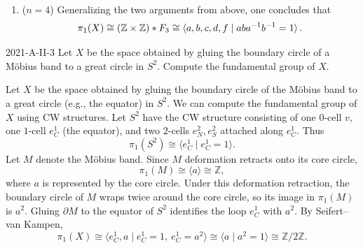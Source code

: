 \documentclass{article}
\begin{document}
\begin{enumerate}[itemsep =-2pt,label = (\arabic{*})]
		\begin{equation*}
			\pi_1(T) \cong (\mathbb{Z} \times \mathbb{Z}) \ast F_2 \cong \braket{a, b, c, d \mid aba^{-1}b^{-1} = 1}. 
		\end{equation*}
		\item ($n = 4$) Generalizing the two arguments from above, one concludes that 
		\begin{equation*}
			\pi_1(X) \cong (\mathbb{Z} \times \mathbb{Z}) \ast F_{3} \cong \braket{a, b, c, d, f \mid aba^{-1}b^{-1} = 1}. 
		\end{equation*}
	\end{enumerate}
	
	\begin{prb}{2021-A-II-3}
		Let $X$ be the space obtained by gluing the boundary circle of a M\"obius band to a great circle in $S^{2}$. Compute the fundamental group of $X$. 
	\end{prb}
	Let $X$ be the space obtained by gluing the boundary circle of the M\"obius band to a great circle (e.g., the equator) in $S^{2}$. We can compute the fundamental group of $X$ using CW structures. Let $S^2$ have the CW structure consisting of one $0$-cell $v$, one $1$-cell $e_C^1$ (the equator), and two $2$-cells $e_N^2,e_S^2$ attached along $e_C^1$. Thus
	\begin{equation*}
		\pi_1(S^2)\cong \langle e_C^1 \mid e_C^1 = 1 \rangle.
	\end{equation*}
	Let $M$ denote the Möbius band. Since $M$ deformation retracts onto its core circle,
	\begin{equation*}
		\pi_1(M)\cong \langle a \rangle \cong \mathbb{Z},
	\end{equation*}
	where $a$ is represented by the core circle. Under this deformation retraction, the boundary circle of $M$ wraps twice around the core circle, so its image in $\pi_1(M)$ is $a^2$. Gluing $\partial M$ to the equator of $S^2$ identifies the loop $e_C^1$ with $a^2$. By Seifert--van Kampen,
	\begin{equation*}
		\pi_1(X)
		\cong
		\langle e_C^1,a \mid e_C^1 = 1,\ e_C^1 = a^2 \rangle
		\cong
		\langle a \mid a^2 = 1 \rangle
		\cong
		\mathbb{Z}/2\mathbb{Z}.
	\end{equation*}
	
\end{document}
